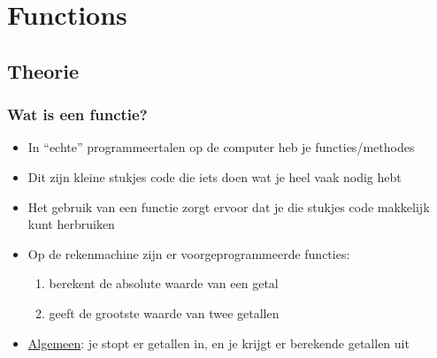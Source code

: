 \section{Functions}

\subsection{Theorie}

\begin{frame}
\frametitle{Wat is een functie?}

\begin{itemize}
  \item<1-> In ``echte'' programmeertalen op de computer heb je functies/methodes
  \item<2-> Dit zijn kleine stukjes code die iets doen wat je heel vaak nodig hebt
  \item<3-> Het gebruik van een functie zorgt ervoor dat je die stukjes code makkelijk kunt herbruiken
  \item<4-> Op de rekenmachine zijn er voorgeprogrammeerde functies:
  \begin{enumerate}
    \item<5->  berekent de absolute waarde van een getal
    \item<6->  geeft de grootste waarde van twee getallen
  \end{enumerate}
  \item<7-> \underline{Algemeen}: je stopt er getallen in, en je krijgt er berekende getallen uit
\end{itemize}

\vspace{2cm}


\end{frame}

